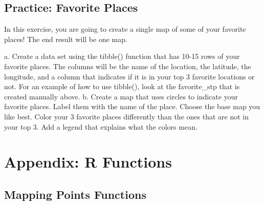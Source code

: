 \documentclass[
  letterpaper,
  DIV=11,
  numbers=noendperiod]{scrreprt}
\newenvironment{Shaded}{\begin{snugshade}}{\end{snugshade}}
\newcommand{\NormalTok}[1]{\textcolor[rgb]{0.00,0.23,0.31}{#1}}
\begin{document}
\subsection*{Practice: Favorite Places}\label{practice-favorite-places}

\begin{Shaded}
\begin{Highlighting}[]
   
\NormalTok{In this exercise, you are going to create a single map of some of your favorite places! The end result will be one map.    }

\NormalTok{a. Create a data set using the \textasciigrave{}tibble()\textasciigrave{} function that has 10{-}15 rows of your favorite places. The columns will be the name of the location, the latitude, the longitude, and a column that indicates if it is in your top 3 favorite locations or not. For an example of how to use \textasciigrave{}tibble()\textasciigrave{}, look at the \textasciigrave{}favorite\_stp\textasciigrave{} that is created manually above.     }
\NormalTok{b. Create a map that uses circles to indicate your favorite places. Label them with the name of the place. Choose the base map you like best. Color your 3 favorite places differently than the ones that are not in your top 3. Add a legend that explains what the colors mean.   }
\end{Highlighting}
\end{Shaded}

\section*{Appendix: R Functions}\label{appendix-r-functions-3}


\subsection*{Mapping Points Functions}\label{mapping-points-functions}
\end{document}
